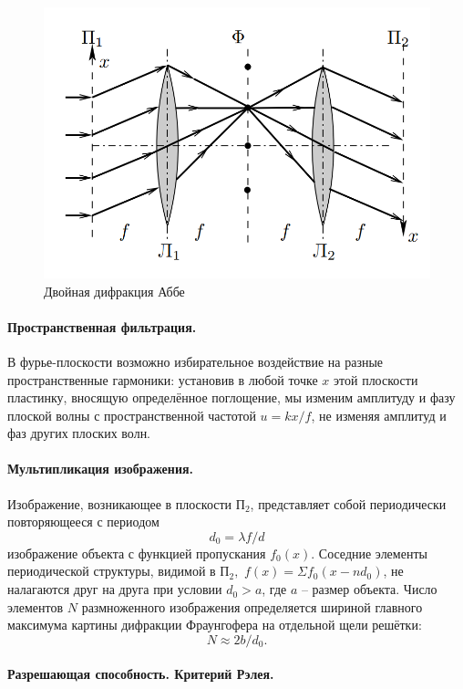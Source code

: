 \documentclass[a4paper]{article}
\begin{document}
\begin{figure}[tbp]
	\centering
	\includegraphics[width=0.8\linewidth]{Screenshot_1}
	\caption{Двойная дифракция Аббе}
	\label{fig:screenshot1}
\end{figure}

\paragraph{Пространственная фильтрация.}

В фурье-плоскости возможно избирательное воздействие на разные пространственные гармоники: установив в любой точке $ x $ этой плоскости пластинку, вносящую определённое поглощение, мы изменим амплитуду и фазу плоской волны с пространственной частотой $ u = k x / f $, не изменяя амплитуд и фаз других плоских волн.

\paragraph{Мультипликация изображения.}

Изображение, возникающее в плоскости $ П_2 $, представляет собой периодически повторяющееся с периодом $$ d_0 = \lambda f / d $$ изображение объекта с функцией пропускания $ f_0 (x) $.
Соседние элементы периодической структуры, видимой в $ П_2, $ $ f(x) = \Sigma f_0(x-n d_0) $, не налагаются друг на друга при условии $ d_0 > a $, где $ a $ -- размер объекта. Число элементов $ N $ размноженного изображения определяется шириной главного максимума картины дифракции Фраунгофера на отдельной щели решётки: $$ N\approx 2 b / d_0. $$

\paragraph{Разрешающая способность. Критерий Рэлея.} 
\end{document}

